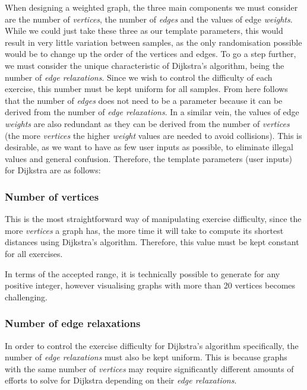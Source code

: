\documentclass{l4proj}
\begin{document}
When designing a weighted graph, the three main components we must consider are the number of \emph{vertices}, the number of \emph{edges} and the values of edge \emph{weights}. While we could just take these three as our template parameters, this would result in very little variation between samples, as the only randomisation possible would be to change up the order of the vertices and edges. To go a step further, we must consider the unique characteristic of Dijkstra's algorithm, being the number of \emph{edge relaxations}. Since we wish to control the difficulty of each exercise, this number must be kept uniform for all samples. From here follows that the number of \emph{edges} does not need to be a parameter because it can be derived from the number of \emph{edge relaxations}. In a similar vein, the values of edge \emph{weights} are also redundant as they can be derived from the number of \emph{vertices} (the more \emph{vertices} the higher \emph{weight} values are needed to avoid collisions). This is desirable, as we want to have as few user inputs as possible, to eliminate illegal values and general confusion. Therefore, the template parameters (user inputs) for Dijkstra are as follows:

\subsubsection{Number of vertices}

This is the most straightforward way of manipulating exercise difficulty, since the more \emph{vertices} a graph has, the more time it will take to compute its shortest distances using Dijkstra's algorithm. Therefore, this value must be kept constant for all exercises. 

In terms of the accepted range, it is technically possible to generate for any positive integer, however visualising graphs with more than 20 vertices becomes challenging.

\subsubsection{Number of edge relaxations}
\label{sec:ernum}

In order to control the exercise difficulty for Dijkstra's algorithm specifically, the number of \emph{edge relaxations} must also be kept uniform. This is because graphs with the same number of \emph{vertices} may require significantly different amounts of efforts to solve for Dijkstra depending on their \emph{edge relaxations}. 
\end{document}
